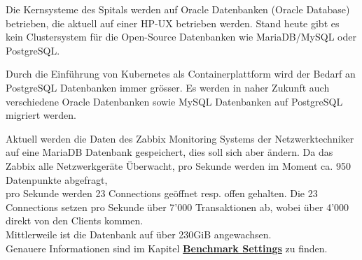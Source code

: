 \begin{flushleft}
    Die Kernsysteme des Spitals werden auf Oracle Datenbanken (\Gls{Oracle Database}) betrieben, die aktuell auf einer \Gls{HP-UX} betrieben werden.
    Stand heute gibt es kein Clustersystem für die Open-Source Datenbanken wie \Gls{MariaDB}/\Gls{MySQL} oder \Gls{PostgreSQL}\@.
\end{flushleft}
\begin{flushleft}
    Durch die Einführung von \Gls{Kubernetes} als Containerplattform wird der Bedarf an \Gls{PostgreSQL} Datenbanken immer grösser.
    Es werden in naher Zukunft auch verschiedene Oracle Datenbanken sowie \Gls{MySQL} Datenbanken auf \Gls{PostgreSQL} migriert werden.
\end{flushleft}
\begin{flushleft}
    Aktuell werden die Daten des \Gls{Zabbix} Monitoring Systems der Netzwerktechniker auf eine \Gls{MariaDB} Datenbank gespeichert, dies soll sich aber ändern.
    Da das \Gls{Zabbix} alle Netzwerkgeräte Überwacht, pro Sekunde werden im Moment ca. 950 Datenpunkte abgefragt,\\pro Sekunde werden 23 Connections geöffnet resp. offen gehalten.
    Die 23 Connections setzen pro Sekunde über 7'000 Transaktionen ab, wobei über 4'000 direkt von den Clients kommen.\\
    Mittlerweile ist die Datenbank auf über 230GiB angewachsen.\\
    Genauere Informationen sind im Kapitel \hyperref[subsubsec:benchmark_settings]{\textbf{Benchmark Settings}} zu finden.
\end{flushleft}
